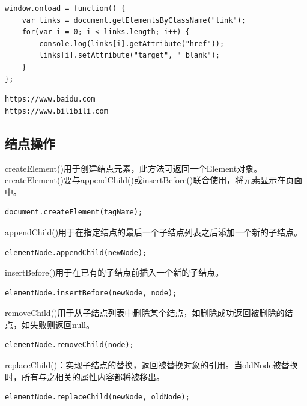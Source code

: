 \begin{lstlisting}[style=htmlcssjs, title=getAttribute.js]
window.onload = function() {
    var links = document.getElementsByClassName("link");
    for(var i = 0; i < links.length; i++) {
        console.log(links[i].getAttribute("href"));
        links[i].setAttribute("target", "_blank");
    }
};
\end{lstlisting}

\begin{tcolorbox}
	\begin{verbatim}
https://www.baidu.com
https://www.bilibili.com
	\end{verbatim}
\end{tcolorbox}

\vspace{0.5cm}

\subsection{结点操作}

createElement()用于创建结点元素，此方法可返回一个Element对象。\\

createElement()要与appendChild()或insertBefore()联合使用，将元素显示在页面中。\\

\begin{lstlisting}[style=htmlcssjs]
document.createElement(tagName);
\end{lstlisting}

appendChild()用于在指定结点的最后一个子结点列表之后添加一个新的子结点。\\

\begin{lstlisting}[style=htmlcssjs]
elementNode.appendChild(newNode);
\end{lstlisting}

insertBefore()用于在已有的子结点前插入一个新的子结点。\\

\begin{lstlisting}[style=htmlcssjs]
elementNode.insertBefore(newNode, node);
\end{lstlisting}

removeChild()用于从子结点列表中删除某个结点，如删除成功返回被删除的结点，如失败则返回null。\\

\begin{lstlisting}[style=htmlcssjs]
elementNode.removeChild(node);
\end{lstlisting}

replaceChild()：实现子结点的替换，返回被替换对象的引用。当oldNode被替换时，所有与之相关的属性内容都将被移出。\\

\begin{lstlisting}[style=htmlcssjs]
elementNode.replaceChild(newNode, oldNode);
\end{lstlisting}